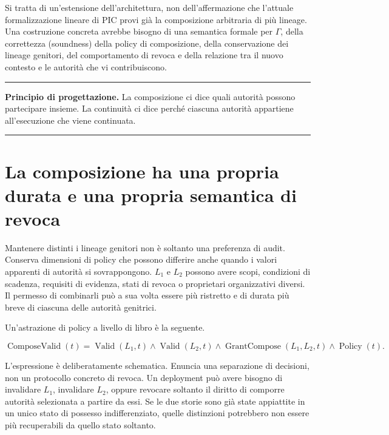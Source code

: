 \documentclass[10pt,oneside,openany]{book}
\newcommand{\principle}[1]{%
  \vspace{4pt}
  \noindent\begin{minipage}{\linewidth}
  \hrule\vspace{5pt}
  \small\sffamily\raggedright\textbf{Principio di progettazione.} #1
  \vspace{5pt}\hrule
  \end{minipage}\vspace{4pt}
}
\begin{document}
Si tratta di un'estensione dell'architettura, non dell'affermazione che l'attuale formalizzazione lineare di PIC provi già la composizione arbitraria di più lineage. Una costruzione concreta avrebbe bisogno di una semantica formale per $\Gamma$, della correttezza (soundness) della policy di composizione, della conservazione dei lineage genitori, del comportamento di revoca e della relazione tra il nuovo contesto e le autorità che vi contribuiscono.

\begin{center}
\end{center}

\principle{La composizione ci dice quali autorità possono partecipare insieme. La continuità ci dice perché ciascuna autorità appartiene all'esecuzione che viene continuata.}

\section{La composizione ha una propria durata e una propria semantica di revoca}
Mantenere distinti i lineage genitori non è soltanto una preferenza di audit. Conserva dimensioni di policy che possono differire anche quando i valori apparenti di autorità si sovrappongono. $L_1$ e $L_2$ possono avere scopi, condizioni di scadenza, requisiti di evidenza, stati di revoca o proprietari organizzativi diversi. Il permesso di combinarli può a sua volta essere più ristretto e di durata più breve di ciascuna delle autorità genitrici.

Un'astrazione di policy a livello di libro è la seguente.
\begin{formulabox}
\[
\operatorname{ComposeValid}(t)=
\operatorname{Valid}(L_1,t)\land
\operatorname{Valid}(L_2,t)\land
\operatorname{GrantCompose}(L_1,L_2,t)\land
\operatorname{Policy}(t).
\]
\end{formulabox}
L'espressione è deliberatamente schematica. Enuncia una separazione di decisioni, non un protocollo concreto di revoca. Un deployment può avere bisogno di invalidare $L_1$, invalidare $L_2$, oppure revocare soltanto il diritto di comporre autorità selezionata a partire da essi. Se le due storie sono già state appiattite in un unico stato di possesso indifferenziato, quelle distinzioni potrebbero non essere più recuperabili da quello stato soltanto.
\end{document}
